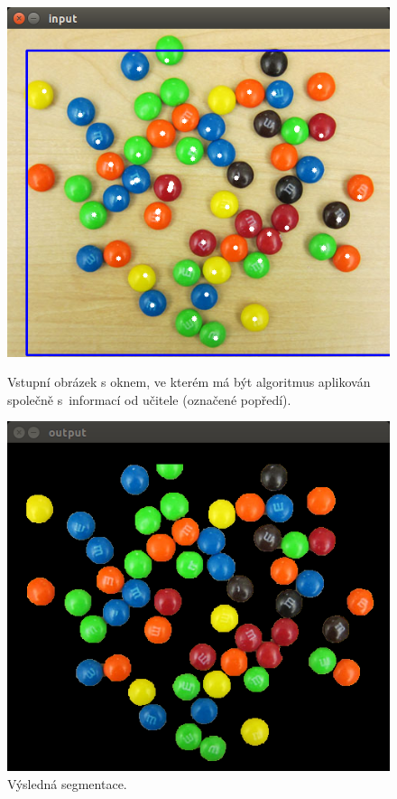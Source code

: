 \documentclass[12pt, a4paper]{article}
\begin{document}
\begin{figure}[!ht]
	\centering
	\begin{minipage}[t]{0.5\textwidth}
		\includegraphics[width = \textwidth]{grabcut_input.png}
	\caption{Vstupní obrázek s oknem, ve kterém má být algoritmus aplikován společně s~informací od učitele (označené popředí).}
		\label{fig:grabcut_input}
	\end{minipage}%
	\hfill
	\begin{minipage}[t]{0.5\textwidth}
		\includegraphics[width = \textwidth]{grabcut_output.png}
		\caption{Výsledná segmentace.}
		\label{fig:grabcut_output}
	\end{minipage}%
\end{figure}
\end{document}
